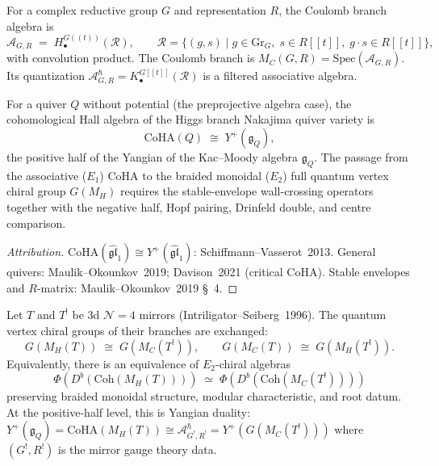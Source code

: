 \begin{definition}
\label{def:phys-bfn}
For a complex reductive group $G$ and representation $R$, the Coulomb branch algebra is
\[
\mathcal{A}_{G,R} \;=\; H^{G(\!(t)\!)}_\bullet(\mathcal{R}), \qquad
\mathcal{R} = \{(g,s) \mid g \in \mathrm{Gr}_G,\; s \in R[\![t]\!],\; g\cdot s \in R[\![t]\!]\},
\]
with convolution product. The Coulomb branch is $M_C(G,R) = \mathrm{Spec}(\mathcal{A}_{G,R})$. Its quantization $\mathcal{A}^\hbar_{G,R} = K^{G[\![t]\!]}_\bullet(\mathcal{R})$ is a filtered associative algebra.
\end{definition}

\begin{theorem}[CoHA = Yangian positive half]
\label{thm:phys-3dm-coha-yangian}
For a quiver $Q$ without potential (the preprojective algebra case), the cohomological Hall algebra of the Higgs branch Nakajima quiver variety is
\[
\mathrm{CoHA}(Q) \;\cong\; Y^+(\mathfrak{g}_Q),
\]
the positive half of the Yangian of the Kac--Moody algebra $\mathfrak{g}_Q$. The passage from the associative ($E_1$) CoHA to the braided monoidal ($E_2$) full quantum vertex chiral group $G(M_H)$ requires the stable-envelope wall-crossing operators together with the negative half, Hopf pairing, Drinfeld double, and centre comparison.
\end{theorem}

\begin{proof}[Attribution]
$\mathrm{CoHA}(\widehat{\mathfrak{gl}}_1) \cong Y^+(\widehat{\mathfrak{gl}}_1)$: Schiffmann--Vasserot~2013. General quivers: Maulik--Okounkov~2019; Davison~2021 (critical CoHA). Stable envelopes and $R$-matrix: Maulik--Okounkov~2019 \S~4.
\end{proof}

\begin{conjecture}
\label{conj:phys-3dm-mirror-qvcg}
\ClaimStatusConjectured
Let $T$ and $T^!$ be 3d $\mathcal{N}=4$ mirrors (Intriligator--Seiberg~1996). The quantum vertex chiral groups of their branches are exchanged:
\begin{equation}\label{eq:phys-mirror-qvcg}
G(M_H(T)) \;\cong\; G(M_C(T^!)), \qquad G(M_C(T)) \;\cong\; G(M_H(T^!)).
\end{equation}
Equivalently, there is an equivalence of $E_2$-chiral algebras
\[
\Phi(D^b(\mathrm{Coh}(M_H(T)))) \;\simeq\; \Phi(D^b(\mathrm{Coh}(M_C(T^!))))
\]
preserving braided monoidal structure, modular characteristic, and root datum. At the positive-half level, this is Yangian duality: $Y^+(\mathfrak{g}_Q) = \mathrm{CoHA}(M_H(T)) \cong \mathcal{A}^\hbar_{G^!,R^!} = Y^+(G(M_C(T^!)))$ where $(G^!, R^!)$ is the mirror gauge theory data.
\end{conjecture}

